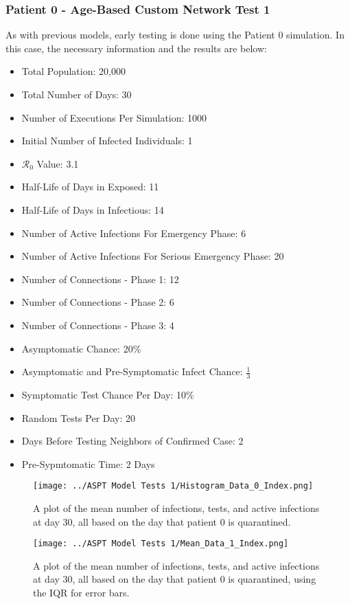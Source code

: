 \documentclass{article}
\numberwithin{equation}{section} %
\begin{document}
\subsubsection{Patient 0 - Age-Based Custom Network Test 1}
As with previous models, early testing is done using the Patient 0 simulation. In this case, the necessary information and the results are below: \\
\begin{itemize}
\item Total Population: 20,000 
\item Total Number of Days: 30
\item Number of Executions Per Simulation: 1000
\item Initial Number of Infected Individuals: 1
\item $\mathcal{R}_0$ Value: 3.1
\item Half-Life of Days in Exposed: 11
\item Half-Life of Days in Infectious: 14
\item Number of Active Infections For Emergency Phase: 6
\item Number of Active Infections For Serious Emergency Phase: 20
\item Number of Connections - Phase 1: 12
\item Number of Connections - Phase 2: 6
\item Number of Connections - Phase 3: 4
\item Asymptomatic Chance: 20\%
\item Asymptomatic and Pre-Symptomatic Infect Chance: $\frac{1}{3}$
\item Symptomatic Test Chance Per Day: 10\%
\item Random Tests Per Day: 20
\item Days Before Testing Neighbors of Confirmed Case: 2
\item Pre-Sypmtomatic Time: 2 Days
\end{itemize}

\begin{figure}[H]
  \centering
  \texttt{[image: ../ASPT Model Tests 1/Histogram\_Data\_0\_Index.png]}
  \caption{A plot of the mean number of infections, tests, and active infections at day 30, all based on the day that patient 0 is quarantined.}
\end{figure}

\begin{figure}[H]
  \centering
  \texttt{[image: ../ASPT Model Tests 1/Mean\_Data\_1\_Index.png]}
  \caption{A plot of the mean number of infections, tests, and active infections at day 30, all based on the day that patient 0 is quarantined, using the IQR for error bars.}
\end{figure}
\end{document}
